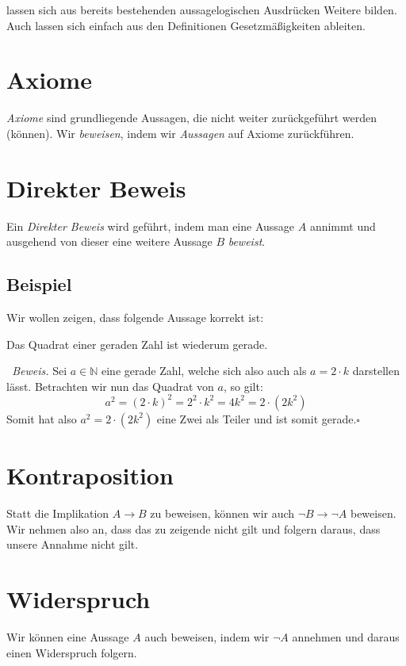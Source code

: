 \documentclass{scrreprt}
\newenvironment{proof}{\emph{\ Beweis.}}{}
\newcommand{\NN}{\mathbb{N}}
\begin{document}
	lassen sich aus bereits bestehenden aussagelogischen Ausdrücken Weitere bilden. Auch lassen sich einfach aus den Definitionen Gesetzmäßigkeiten ableiten.

	\section{Axiome}
	\emph{Axiome} sind grundliegende Aussagen, die nicht weiter zurückgeführt werden (können). Wir \emph{beweisen}, indem wir \emph{Aussagen} auf Axiome zurückführen.

	\section{Direkter Beweis}
	Ein \emph{Direkter Beweis} wird geführt, indem man eine Aussage $A$ annimmt und ausgehend von dieser eine weitere Aussage $B$ \emph{beweist}.

	\subsection{Beispiel}
	Wir wollen zeigen, dass folgende Aussage korrekt ist:
	\begin{center}
		Das Quadrat einer geraden Zahl ist wiederum gerade.
	\end{center}
	\begin{proof}
		Sei $a \in \NN$ eine gerade Zahl, welche sich also auch als $a = 2 \cdot k$ darstellen lässt. Betrachten wir nun das Quadrat von $a$, so gilt:
		\begin{equation*}
			a^2 = (2 \cdot k)^2 = 2^2 \cdot k^2 = 4 k^2 = 2 \cdot (2 k^2)
		\end{equation*}
		Somit hat also $a^2 = 2 \cdot (2 k^2)$ eine Zwei als Teiler und ist somit gerade.$\square$
	\end{proof}

	\section{Kontraposition}
	Statt die Implikation $A \rightarrow B$ zu beweisen, können wir auch $\neg B \rightarrow \neg A$ beweisen. Wir nehmen also an, dass das zu zeigende nicht gilt und folgern daraus, dass unsere Annahme nicht gilt.

	\section{Widerspruch}
	Wir können eine Aussage $A$ auch beweisen, indem wir $\neg A$ annehmen und daraus einen Widerspruch folgern.
\end{document}
